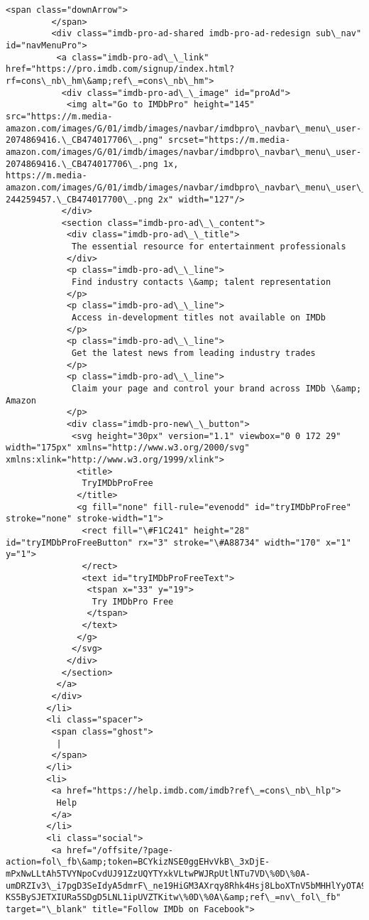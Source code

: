 \documentclass[11pt]{article}
\begin{document}
\begin{Verbatim}[commandchars=\\\{\}]
         <span class="downArrow">
         </span>
         <div class="imdb-pro-ad-shared imdb-pro-ad-redesign sub\_nav" id="navMenuPro">
          <a class="imdb-pro-ad\_\_link" href="https://pro.imdb.com/signup/index.html?rf=cons\_nb\_hm\&amp;ref\_=cons\_nb\_hm">
           <div class="imdb-pro-ad\_\_image" id="proAd">
            <img alt="Go to IMDbPro" height="145" src="https://m.media-amazon.com/images/G/01/imdb/images/navbar/imdbpro\_navbar\_menu\_user-2074869416.\_CB474017706\_.png" srcset="https://m.media-amazon.com/images/G/01/imdb/images/navbar/imdbpro\_navbar\_menu\_user-2074869416.\_CB474017706\_.png 1x,
https://m.media-amazon.com/images/G/01/imdb/images/navbar/imdbpro\_navbar\_menu\_user\_2x-244259457.\_CB474017700\_.png 2x" width="127"/>
           </div>
           <section class="imdb-pro-ad\_\_content">
            <div class="imdb-pro-ad\_\_title">
             The essential resource for entertainment professionals
            </div>
            <p class="imdb-pro-ad\_\_line">
             Find industry contacts \&amp; talent representation
            </p>
            <p class="imdb-pro-ad\_\_line">
             Access in-development titles not available on IMDb
            </p>
            <p class="imdb-pro-ad\_\_line">
             Get the latest news from leading industry trades
            </p>
            <p class="imdb-pro-ad\_\_line">
             Claim your page and control your brand across IMDb \&amp; Amazon
            </p>
            <div class="imdb-pro-new\_\_button">
             <svg height="30px" version="1.1" viewbox="0 0 172 29" width="175px" xmlns="http://www.w3.org/2000/svg" xmlns:xlink="http://www.w3.org/1999/xlink">
              <title>
               TryIMDbProFree
              </title>
              <g fill="none" fill-rule="evenodd" id="tryIMDbProFree" stroke="none" stroke-width="1">
               <rect fill="\#F1C241" height="28" id="tryIMDbProFreeButton" rx="3" stroke="\#A88734" width="170" x="1" y="1">
               </rect>
               <text id="tryIMDbProFreeText">
                <tspan x="33" y="19">
                 Try IMDbPro Free
                </tspan>
               </text>
              </g>
             </svg>
            </div>
           </section>
          </a>
         </div>
        </li>
        <li class="spacer">
         <span class="ghost">
          |
         </span>
        </li>
        <li>
         <a href="https://help.imdb.com/imdb?ref\_=cons\_nb\_hlp">
          Help
         </a>
        </li>
        <li class="social">
         <a href="/offsite/?page-action=fol\_fb\&amp;token=BCYkizNSE0ggEHvVkB\_3xDjE-mPxNwLLtAh5TVYNpoCvdUJ91ZzUQYTYxkVLtwPWJRpUtlNTu7VD\%0D\%0A-umDRZIv3\_i7pgD3SeIdyA5dmrF\_ne19HiGM3AXrqy8Rhk4Hsj8LboXTnV5bMHHlYyOTA9NGvqTv\%0D\%0AtO3jAwPhM-KS5BySJETXIURa5SDgD5LNL1ipUVZTKitw\%0D\%0A\&amp;ref\_=nv\_fol\_fb" target="\_blank" title="Follow IMDb on Facebook">

\end{Verbatim}
\end{document}
